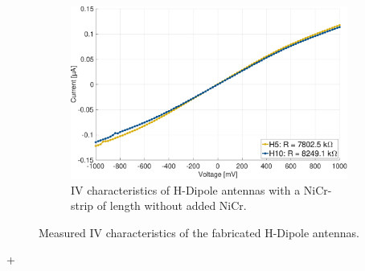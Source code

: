 \begin{figure}[ht]
    \begin{subfigure}[b]{0.49\textwidth}
        \centering
        \includegraphics[width=\textwidth]{figures/IV_v2/IV_H5_H10.pdf}
        \caption{IV characteristics of H-Dipole antennas with a NiCr-strip of length without added NiCr.}
        \label{fig:sub5}
    \end{subfigure}

    \caption{Measured IV characteristics of the fabricated H-Dipole antennas.}
    \label{fig:main_IV_dipoles}
\end{figure}+


    

    
